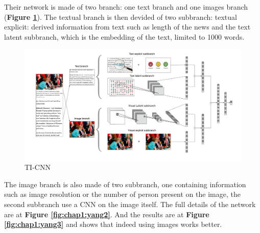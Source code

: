 Their network is made of two branch: one text branch and one images branch (\textbf{Figure \ref{fig:chap1:yang1}}). The textual branch is then devided of two subbranch: textual explicit: derived information from text such as length of the news and the text latent subbranch, which is the embedding of the text, limited to 1000 words. \\
\begin{figure}[h]
	\centering
	\includegraphics[width=\textwidth]{images/chap1_bis/rev7.png}
	\caption{TI-CNN }
	\label{fig:chap1:yang1}
\end{figure}

The image branch is also made of two subbranch, one containing information such as image resolution or the number of person present on the image, the second subbranch use a CNN on the image itself. The full details of the network are at \textbf{Figure \ref{fig:chap1:yang2}}. And the results are at \textbf{Figure \ref{fig:chap1:yang3}} and shows that indeed using images works better. 

